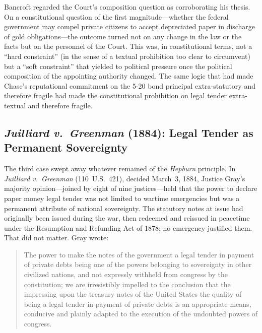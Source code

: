 \documentclass[12pt]{article}
\begin{document}
Bancroft regarded the Court's composition question as corroborating his
thesis.  On a constitutional question of the first magnitude---whether
the federal government may compel private citizens to accept depreciated
paper in discharge of gold obligations---the outcome turned not on any
change in the law or the facts but on the personnel of the Court.  This was, in constitutional terms, not a
``hard constraint'' (in the sense of a textual prohibition too clear
to circumvent) but a ``soft constraint'' that yielded to political
pressure once the political composition of the appointing authority
changed.  The same logic that had made Chase's reputational commitment
on the 5-20 bond principal extra-statutory and therefore fragile had
made the constitutional prohibition on legal tender extra-textual and
therefore fragile.

\subsection{\textit{Juilliard v.\ Greenman} (1884): Legal Tender as
             Permanent Sovereignty}

The third case swept away whatever remained of the
\textit{Hepburn} principle.  In \textit{Juilliard v.\ Greenman}
(110~U.S.\ 421), decided March~3, 1884, Justice Gray's majority
opinion---joined by eight of nine justices---held that the power to
declare paper money legal tender was not limited to wartime emergencies
but was a permanent attribute of national sovereignty.  The statutory
notes at issue had originally been issued during the war, then redeemed
and reissued in peacetime under the Resumption and Refunding Act of
1878; no emergency justified them.  That did not matter.  Gray wrote:

\begin{quote}
The power to make the notes of the government a legal tender in payment
of private debts being one of the powers belonging to sovereignty in
other civilized nations, and not expressly withheld from congress by
the constitution; we are irresistibly impelled to the conclusion that
the impressing upon the treasury notes of the United States the quality
of being a legal tender in payment of private debts is an appropriate
means, conducive and plainly adapted to the execution of the undoubted
powers of congress.
\end{quote}
\end{document}
